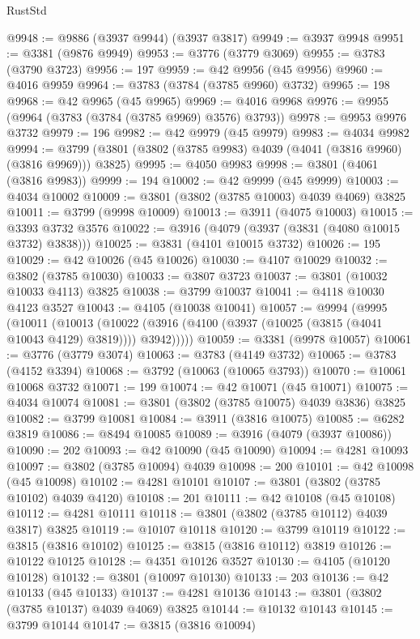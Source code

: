 \begin{lexlean}{RustStd}
\begin{coremodule}
@9948 := @9886 (@3937 @9944) (@3937 @3817)
@9949 := @3937 @9948
@9951 := @3381 (@9876 @9949)
@9953 := @3776 (@3779 @3069)
@9955 := @3783 (@3790 @3723)
@9956 := 197
@9959 := @42 @9956 (@45 @9956)
@9960 := @4016 @9959
@9964 := @3783 (@3784 (@3785 @9960) @3732)
@9965 := 198
@9968 := @42 @9965 (@45 @9965)
@9969 := @4016 @9968
@9976 := @9955 (@9964 (@3783 (@3784 (@3785 @9969) @3576) @3793))
@9978 := @9953 @9976 @3732
@9979 := 196
@9982 := @42 @9979 (@45 @9979)
@9983 := @4034 @9982
@9994 := @3799 (@3801 (@3802 (@3785 @9983) @4039 (@4041 (@3816 @9960) (@3816 @9969))) @3825)
@9995 := @4050 @9983
@9998 := @3801 (@4061 (@3816 @9983))
@9999 := 194
@10002 := @42 @9999 (@45 @9999)
@10003 := @4034 @10002
@10009 := @3801 (@3802 (@3785 @10003) @4039 @4069) @3825
@10011 := @3799 (@9998 @10009)
@10013 := @3911 (@4075 @10003)
@10015 := @3393 @3732 @3576
@10022 := @3916 (@4079 (@3937 (@3831 (@4080 @10015 @3732) @3838)))
@10025 := @3831 (@4101 @10015 @3732)
@10026 := 195
@10029 := @42 @10026 (@45 @10026)
@10030 := @4107 @10029
@10032 := @3802 (@3785 @10030)
@10033 := @3807 @3723
@10037 := @3801 (@10032 @10033 @4113) @3825
@10038 := @3799 @10037
@10041 := @4118 @10030 @4123 @3527
@10043 := @4105 (@10038 @10041)
@10057 := @9994
    (@9995
      (@10011
        (@10013
          (@10022 (@3916 (@4100 (@3937 (@10025 (@3815 (@4041 @10043 @4129) @3819)))) @3942)))))
@10059 := @3381 (@9978 @10057)
@10061 := @3776 (@3779 @3074)
@10063 := @3783 (@4149 @3732)
@10065 := @3783 (@4152 @3394)
@10068 := @3792 (@10063 (@10065 @3793))
@10070 := @10061 @10068 @3732
@10071 := 199
@10074 := @42 @10071 (@45 @10071)
@10075 := @4034 @10074
@10081 := @3801 (@3802 (@3785 @10075) @4039 @3836) @3825
@10082 := @3799 @10081
@10084 := @3911 (@3816 @10075)
@10085 := @6282 @3819
@10086 := @8494 @10085
@10089 := @3916 (@4079 (@3937 @10086))
@10090 := 202
@10093 := @42 @10090 (@45 @10090)
@10094 := @4281 @10093
@10097 := @3802 (@3785 @10094) @4039
@10098 := 200
@10101 := @42 @10098 (@45 @10098)
@10102 := @4281 @10101
@10107 := @3801 (@3802 (@3785 @10102) @4039 @4120)
@10108 := 201
@10111 := @42 @10108 (@45 @10108)
@10112 := @4281 @10111
@10118 := @3801 (@3802 (@3785 @10112) @4039 @3817) @3825
@10119 := @10107 @10118
@10120 := @3799 @10119
@10122 := @3815 (@3816 @10102)
@10125 := @3815 (@3816 @10112) @3819
@10126 := @10122 @10125
@10128 := @4351 @10126 @3527
@10130 := @4105 (@10120 @10128)
@10132 := @3801 (@10097 @10130)
@10133 := 203
@10136 := @42 @10133 (@45 @10133)
@10137 := @4281 @10136
@10143 := @3801 (@3802 (@3785 @10137) @4039 @4069) @3825
@10144 := @10132 @10143
@10145 := @3799 @10144
@10147 := @3815 (@3816 @10094)

\end{coremodule}
\end{lexlean}
